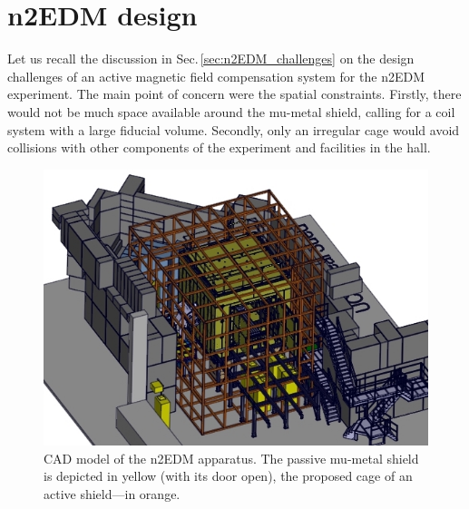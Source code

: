 \section{n2EDM design}
Let us recall the discussion in Sec.\,\ref{sec:n2EDM_challenges} on the design challenges of an active magnetic field compensation system for the n2EDM experiment.
The main point of concern were the spatial constraints.
Firstly, there would not be much space available around the mu-metal shield, calling for a coil system with a large fiducial volume.
Secondly, only an irregular cage would avoid collisions with other components of the experiment and facilities in the hall.

\begin{figure}
  \centering
  \includegraphics[width=\linewidth]{gfx/prototype/Bild20.jpg}
  \caption{CAD model of the n2EDM apparatus.
  The passive mu-metal shield is depicted in yellow (with its door open),
  the proposed cage of an active shield---in orange.}\label{fig:n2EDM_design_3d}
\end{figure}

